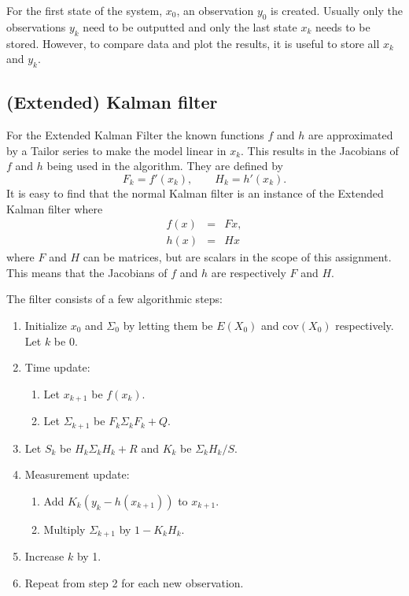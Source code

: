 \documentclass[paper=a4, fontsize=11pt]{scrartcl} %
\numberwithin{equation}{section} %
\numberwithin{figure}{section} %
\numberwithin{table}{section} %
\begin{document}
For the first state of the system, $x_0$, an observation $y_0$ is created. Usually only the observations $y_k$ need to be outputted and only the last state $x_k$ needs to be stored. However, to compare data and plot the results, it is useful to store all $x_k$ and $y_k$.


\subsection{(Extended) Kalman filter}

For the Extended Kalman Filter the known functions $f$ and $h$ are approximated by a Tailor series to make the model linear in $x_k$. This results in the Jacobians of $f$ and $h$ being used in the algorithm. They are defined by
$$
F_k=f'(x_k),\qquad H_k=h'(x_k).
$$
It is easy to find that the normal Kalman filter is an instance of the Extended Kalman filter where 
\begin{eqnarray*}
	f(x) &=& Fx,\\
	h(x) &=& Hx
\end{eqnarray*}
where $F$ and $H$ can be matrices, but are scalars in the scope of this assignment. This means that the Jacobians of $f$ and $h$ are respectively $F$ and $H$. 

The filter consists of a few algorithmic steps:
\begin{enumerate}
	\item Initialize $x_0$ and $\Sigma_0$ by letting them be $E(X_0)$ and $\text{cov}(X_0)$ respectively. Let $k$ be $0$.
	\item Time update:
	\begin{enumerate}
		\item Let $x_{k+1}$ be $f(x_k)$. 
		\item Let $\Sigma_{k+1}$ be $F_k \Sigma_k F_k+Q$. 
	\end{enumerate}
	\item Let $S_k$ be $H_k\Sigma_kH_k+R$ and $K_k$ be $\Sigma_kH_k/S$.
	\item Measurement update:
	\begin{enumerate}
		\item Add $K_k(y_k-h(x_{k+1}))$ to $x_{k+1}$. 
		\item Multiply $\Sigma_{k+1}$ by $1-K_k H_k$. 
	\end{enumerate}
	\item Increase $k$ by 1.
	\item Repeat from step 2 for each new observation.
\end{enumerate}
\end{document}
